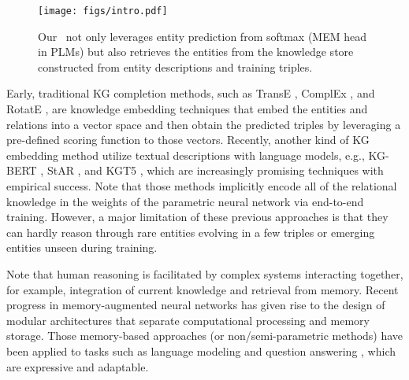 \documentclass[runningheads]{llncs}
\begin{document}
\begin{figure}[htbp]
    \centering
    \texttt{[image: figs/intro.pdf]}
    \caption{Our \ours~not only leverages entity prediction from softmax (MEM head in PLMs) but also retrieves the entities from the knowledge store constructed from entity descriptions and training triples.}
    \label{fig:intro}
\end{figure}
Early, traditional KG completion methods, such as TransE \cite{Bordes:TransE}, ComplEx \cite{complex}, and RotatE \cite{RotatE}, are knowledge embedding techniques that embed the entities and relations into a vector space and then obtain the predicted triples by leveraging a pre-defined scoring function to those vectors. 
Recently, another kind of KG embedding method utilize textual descriptions with language models, e.g., KG-BERT \cite{kgbert}, StAR \cite{STAR}, and KGT5 \cite{kgt5}, which are increasingly promising techniques with empirical success.
Note that those methods implicitly encode all of the relational knowledge in the weights of the parametric neural network via end-to-end training.
However, a major limitation of these previous approaches is that they can hardly reason through rare entities evolving in a few triples or emerging entities unseen during training. 
 
Note that human reasoning is facilitated by complex systems interacting together, for example, integration of current knowledge and retrieval from memory. 
Recent progress in memory-augmented neural networks has given rise to the design of modular architectures that separate computational processing and memory storage. 
Those memory-based approaches (or non/semi-parametric methods) have been applied to tasks such as language modeling \cite{DBLP:conf/iclr/KhandelwalLJZL20} and question answering \cite{DBLP:conf/emnlp/KassnerS20}, which are expressive and adaptable. 
\end{document}
